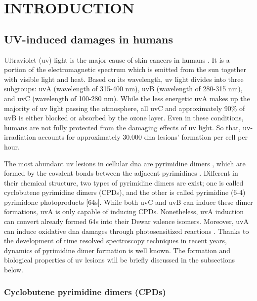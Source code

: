 \setlength{\parindent}{0pt}
\chapter{\bf INTRODUCTION}

\section{UV-induced damages in humans}

Ultraviolet (\gls{uv}) light is the major cause of skin cancers in humans \citep{kiefer2007effects}. It is a portion of the electromagnetic spectrum which is emitted from the sun together with visible light and heat. Based on its wavelength, \gls{uv} light divides into three subgroups: \gls{uv}A (wavelength of 315-400 nm), \gls{uv}B (wavelength of 280-315 nm), and \gls{uv}C (wavelength of 100-280 nm). While the less energetic \gls{uv}A makes up the majority of \gls{uv} light passing the atmosphere, all \gls{uv}C and approximately 90\% of \gls{uv}B is either blocked or absorbed by the ozone layer. Even in these conditions, humans are not fully protected from the damaging effects of \gls{uv} light. So that, \gls{uv}-irradiation accounts for approximately 30.000 \gls{dna} lesions’ formation per cell per hour.

The most abundant \gls{uv} lesions in cellular \gls{dna} are pyrimidine dimers \citep{kielbassa1997wavelength}, which are formed by the covalent bonds between the adjacent pyrimidines \citep{whitmore2001effect}. Different in their chemical structure, two types of pyrimidine dimers are exist; one is called cyclobutene pyrimidine dimers (\gls{CPD}s), and the other is called pyrimidine (6-4) pyrimidone photoproducts [\gls{64}s]. While both \gls{uv}C and \gls{uv}B can induce these dimer formations, \gls{uv}A is only capable of inducing \gls{CPD}s. Nonetheless, \gls{uv}A induction can convert already formed \gls{64}s into their Dewar valence isomers. Moreover, \gls{uv}A can induce oxidative \gls{dna} damages through photosensitized reactions \citep{hu2017cartography}. Thanks to the development of time resolved spectroscopy techniques in recent years, dynamics of pyrimidine dimer formation is well known. The formation and biological properties of \gls{uv} lesions will be briefly discussed in the subsections below.   

\subsection{Cyclobutene pyrimidine dimers (CPDs)} 

